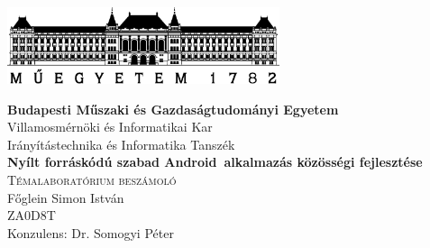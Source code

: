\begin{titlepage}
	\begin{center}
		\includegraphics[keepaspectratio, width=8cm]{include/BME1782.eps} \\
		\vspace{5mm}

		\large \textbf{Budapesti Műszaki és Gazdaságtudományi Egyetem} \\
		Villamosmérnöki és Informatikai Kar \\
		Irányítástechnika és Informatika Tanszék \\
		\vspace{3cm}
		\huge \textbf{Nyílt forráskódú szabad Android~alkalmazás közösségi fejlesztése}  \\
		\vspace{1cm}
		\textsc{Témalaboratórium beszámoló} \\
		\vfill
		\Large Főglein Simon István \\ ZA0D8T \\
		\vspace{1.6cm}
		\large Konzulens: Dr. Somogyi Péter
		\vfill
		\large {}
	\end{center}
\end{titlepage}
